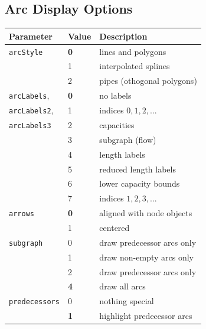 \documentclass[a4paper,11pt,twoside]{book}
\begin{document}
\begin{multicols}{2}
\subsection{Arc Display Options}
\label{slb_arc_display}
\medskip
\begin{center}
\begin{tabular}{|p{2.5cm}|p{1.2cm}|p{8.0cm}|}
\hline
{\bf Parameter} & {\bf Value} & {\bf Description} \\
\hline
\hline
\verb/arcStyle/     & {\bf 0} & lines and polygons \\
                    & 1 & interpolated splines \\
                    & 2 & pipes (othogonal polygons) \\
\hline
\verb/arcLabels/,   & {\bf 0} & no labels \\
\verb/arcLabels2/,  & 1 & indices $0,1,2,...$\\
\verb/arcLabels3/   & 2 & capacities \\
                    & 3 & subgraph (flow) \\
                    & 4 & length labels \\
                    & 5 & reduced length labels \\
                    & 6 & lower capacity bounds \\
                    & 7 & indices $1,2,3,...$ \\
\hline
\verb/arrows/       & {\bf 0} & aligned with node objects \\
                    & 1 & centered \\
\hline
\verb/subgraph/     & 0 & draw predecessor arcs only \\
                    & 1 & draw non-empty arcs only \\
                    & 2 & draw predecessor arcs only \\
                    & {\bf 4} & draw all arcs \\
\hline
\verb/predecessors/ & 0 & nothing special \\
                    & {\bf 1} & highlight predecessor arcs \\
\hline
\end{tabular}
\end{center}
\bigskip



\end{multicols}
\end{document}

